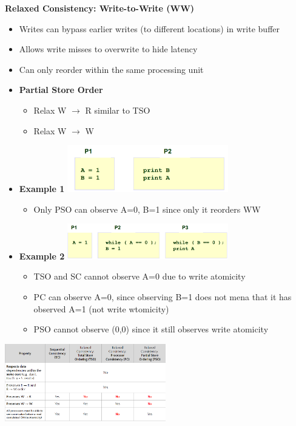 \documentclass[10pt, landscape]{article}
\begin{document}
\begin{multicols}{4}
\textbf{Relaxed Consistency: Write-to-Write (WW)}
\begin{itemize}
    \item Writes can bypass earlier writes (to different locations) in write buffer 
    \item Allows write misses to overwrite to hide latency
    \item Can only reorder within the same processing unit 
    \item \textbf{Partial Store Order}
    \begin{itemize}
        \item Relax W $\rightarrow$ R similar to TSO 
        \item Relax W $\rightarrow$ W
    \end{itemize}
    \item \textbf{Example 1}
    \includegraphics*[width=7cm]{mem_model_eg2.png}
    \begin{itemize}
        \item Only PSO can observe A=0, B=1 since only it reorders WW
    \end{itemize}

    \item \textbf{Example 2}
    \includegraphics*[width=7cm]{mem_model_eg1.png}
    \begin{itemize}
        \item TSO and SC cannot observe A=0 due to write atomicity 
        \item PC can observe A=0, since observing B=1 does not mena that it has observed A=1 (not write wtomicity)
        \item PSO cannot observe (0,0) since it still observes write atomicity
    \end{itemize}
\end{itemize}

\includegraphics*[width=7cm]{mem_model_summary.png}



\end{multicols}
\end{document}
